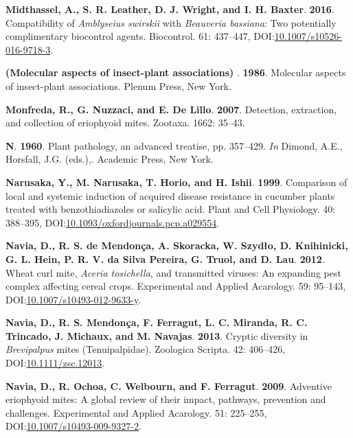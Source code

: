 \documentclass[12pt,final,CPage]{ufthesis}
\newlength{\cslhangindent}
\newenvironment{CSLReferences}[2] %
{%
	\setlength{\parindent}{0pt}
	\ifodd #1 \everypar{\setlength{\hangindent}{\cslhangindent}}\ignorespaces\fi
	\ifnum #2 > 0
	\setlength{\parskip}{#2\baselineskip}
	\fi
}%
{}
\begin{document}
{\begin{CSLReferences}{1}{0}
  \leavevmode{}%
  \textbf{Midthassel, A., S. R. Leather, D. J. Wright, and I. H. Baxter}. \textbf{2016}. Compatibility of {\emph{Amblyseius swirskii}} with {\emph{Beauveria bassiana}}: Two potentially complimentary biocontrol agents. Biocontrol. 61: 437--447, DOI:\href{https://doi.org/10.1007/s10526-016-9718-3}{10.1007/s10526-016-9718-3}.

  \leavevmode{}%
  \textbf{(Molecular aspects of insect-plant associations) }. \textbf{1986}. Molecular aspects of insect-plant associations. Plenum Press, New York.

  \leavevmode{}%
  \textbf{Monfreda, R., G. Nuzzaci, and E. De Lillo}. \textbf{2007}. Detection, extraction, and collection of eriophyoid mites. Zootaxa. 1662: 35--43.

  \leavevmode{}%
  \textbf{N}. \textbf{1960}. Plant pathology, an advanced treatise, pp. 357--429. \emph{In} Dimond, A.E., Horsfall, J.G. (eds.),. Academic Press, New York.

  \leavevmode{}%
  \textbf{Narusaka, Y., M. Narusaka, T. Horio, and H. Ishii}. \textbf{1999}. Comparison of local and systemic induction of acquired disease resistance in cucumber plants treated with benzothiadiazoles or salicylic acid. Plant and Cell Physiology. 40: 388--395, DOI:\href{https://doi.org/10.1093/oxfordjournals.pcp.a029554}{10.1093/oxfordjournals.pcp.a029554}.

  \leavevmode{}%
  \textbf{Navia, D., R. S. de Mendonça, A. Skoracka, W. Szydło, D. Knihinicki, G. L. Hein, P. R. V. da Silva Pereira, G. Truol, and D. Lau}. \textbf{2012}. {Wheat curl mite}, {\emph{Aceria tosichella}}, and transmitted viruses: An expanding pest complex affecting cereal crops. Experimental and Applied Acarology. 59: 95--143, DOI:\href{https://doi.org/10.1007/s10493-012-9633-y}{10.1007/s10493-012-9633-y}.

  \leavevmode{}%
  \textbf{Navia, D., R. S. Mendonça, F. Ferragut, L. C. Miranda, R. C. Trincado, J. Michaux, and M. Navajas}. \textbf{2013}. Cryptic diversity in {\emph{Brevipalpus}} mites ({Tenuipalpidae}). Zoologica Scripta. 42: 406--426, DOI:\href{https://doi.org/10.1111/zsc.12013}{10.1111/zsc.12013}.

  \leavevmode{}%
  \textbf{Navia, D., R. Ochoa, C. Welbourn, and F. Ferragut}. \textbf{2009}. Adventive eriophyoid mites: A global review of their impact, pathways, prevention and challenges. Experimental and Applied Acarology. 51: 225--255, DOI:\href{https://doi.org/10.1007/s10493-009-9327-2}{10.1007/s10493-009-9327-2}.


\end{CSLReferences}}
\end{document}
